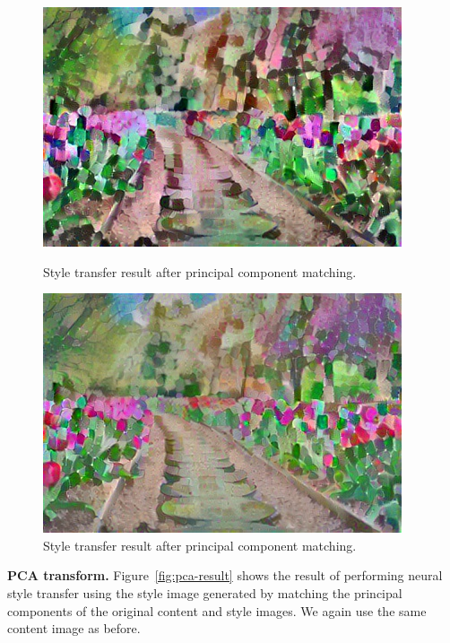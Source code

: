\documentclass[10pt,twocolumn,letterpaper]{article}
\begin{document}
\begin{figure}[ht]
\centering
\begin{minipage}{0.48\linewidth}
\centering
\includegraphics[width=\linewidth]{imgs/flowers-rgb-pca.jpg}
\caption{Style transfer result after principal component matching.}
\label{fig:pca-result}
\end{minipage}
\quad
\begin{minipage}{0.48\linewidth}
\centering
\includegraphics[width=\linewidth]{imgs/flowers-rgb-rot.jpg}
\caption{Style transfer result after principal component matching.}
\label{fig:rot-result}
\end{minipage}
\end{figure}

\bigbreak\noindent\textbf{PCA transform.}
Figure~\ref{fig:pca-result} shows the result of performing neural style transfer using the style image generated by matching the principal components of the original content and style images. We again use the same content image as before.
\end{document}
